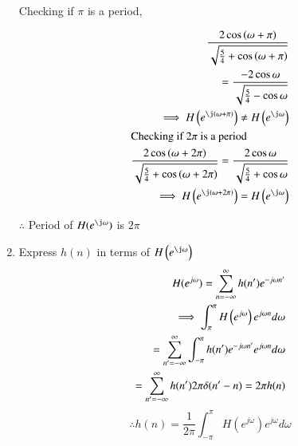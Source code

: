 \documentclass[journal,12pt,twocolumn]{IEEEtran}
\renewcommand\thesection{\arabic{section}}
\begin{document}
\begin{enumerate}[label=\thesection.\arabic*]
	Checking if $\pi$ is a period,

	\begin{align}
		\frac{2\cos\brak{\omega+\pi}}{\sqrt{\frac{5}{4}+\cos\brak{\omega+\pi}}}\\ =
		\frac{-2\cos\omega}{\sqrt{\frac{5}{4}-\cos\omega}}\\
		\implies H\brak{e^{\j \brak{\omega+\pi}}} \neq H\brak{e^{\j \omega}}\\
	\intertext{Checking if $2\pi$ is a period}
		\dfrac{2\cos\brak{\omega+2\pi}}{\sqrt{\frac{5}{4}+\cos\brak{\omega + 2\pi}}} =
		\frac{2\cos \omega}{\sqrt{\frac{5}{4} + \cos \omega }}\\
		\implies H\brak{e^{\j \brak{\omega + 2\pi}}} = H\brak{e^{\j \omega}}
	\end{align}
	
$\therefore$ Period of $H(e^{\j \omega})$ is $2\pi$\\
	\item Express $h(n)$ in terms of $H\brak{e^{\j \omega}}$ \\[5pt]
	\solution
		\begin{align}
		H( e^{j\omega }) =\sum ^{\infty }_{n=-\infty }h(n') e^{-j\omega n'}\\
		\implies \int_{\-\pi} ^{\pi }	H\left( e^{j\omega }\right) e^{j\omega n}d\omega\\			
		= \sum_{n'=-\infty }^{\infty } \int ^{\pi }_{-\pi }h(n') e^{-j\omega n'}e^{j\omega n}d\omega\\			
		=\sum ^{\infty }_{n'=-\infty }h(n') 2\pi \delta(n'- n) =
	 2\pi h(n) 
		\end{align}
	\begin{equation}
		\therefore	 h(n) =\dfrac{1}{2\pi }\int ^{\pi }_{-\pi }H\left( e^{j \omega}\right) e^{j\omega }d\omega 
	\end{equation}

	\end{enumerate}
	
\end{document}
